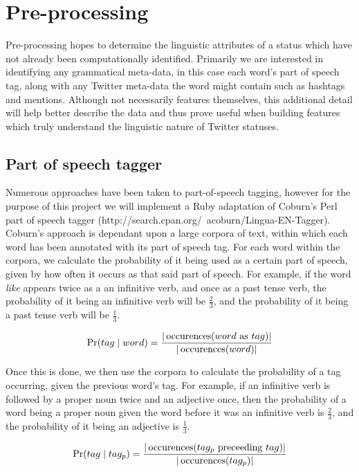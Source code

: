 \section{Pre-processing}
\label{subjectivity:pre-processing}

Pre-processing hopes to determine the linguistic attributes of a status which have not already been computationally identified. Primarily we are interested in identifying any grammatical meta-data, in this case each word's part of speech tag, along with any Twitter meta-data the word might contain such as hashtags and mentions. Although not necessarily features themselves, this additional detail will help better describe the data and thus prove useful when building features which truly understand the linguistic nature of Twitter statuses.

\subsection{Part of speech tagger}

Numerous approaches have been taken to part-of-speech tagging, however for the purpose of this project we will implement a Ruby adaptation of Coburn's Perl part of speech tagger (http\-://\-search\-.cpan\-.org\-/~\-acoburn\-/Lingua\--EN\--Tagger). Coburn's approach is dependant upon a large corpora of text, within which each word has been annotated with its part of speech tag. For each word within the corpora, we calculate the probability of it being used as a certain part of speech, given by how often it occurs as that said part of speech. For example, if the word \emph{like} appears twice as a an infinitive verb, and once as a past tense verb, the probability of it being an infinitive verb will be $\frac{2}{3}$, and the probability of it being a past tense verb will be $\frac{1}{3}$.

\begin{equation}
	\Pr(tag \mid word) = \frac{|\operatorname*{occurences}(word \text{ as } tag)|}{|\operatorname*{occurences}(word)|}
\end{equation}

Once this is done, we then use the corpora to calculate the probability of a tag occurring, given the previous word's tag. For example, if an infinitive verb is followed by a proper noun twice and an adjective once, then the probability of a word being a proper noun given the word before it was an infinitive verb is $\frac{2}{3}$, and the probability of it being an adjective is $\frac{1}{3}$.

\begin{equation}
	\Pr(tag \mid tag_{p}) = \frac{|\operatorname*{occurences}(tag_{p} \text{ preceeding } tag)|}{|\operatorname*{occurences}(tag_p)|}
\end{equation}

